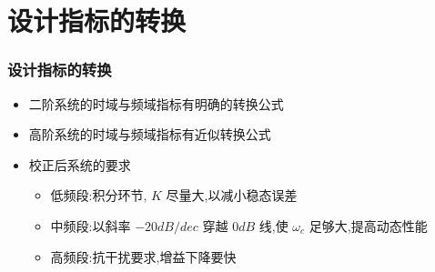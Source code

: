 \documentclass[table]{beamer}
\begin{document}
\section{设计指标的转换}
\label{sec-2}
\begin{frame}
\frametitle{设计指标的转换}
\label{sec-2-1}

\begin{itemize}
\item <2->二阶系统的时域与频域指标有明确的转换公式
\item <3->高阶系统的时域与频域指标有近似转换公式
\item <4->校正后系统的要求
\begin{itemize}
\item <4->低频段:积分环节, $K$ 尽量大,以减小稳态误差
\item <5->中频段:以斜率 $-20dB/dec$ 穿越 $0dB$ 线,使 $\omega_c$ 足够大,提高动态性能
\item <6->高频段:抗干扰要求,增益下降要快
\end{itemize}
\end{itemize}
\end{frame}
\end{document}
